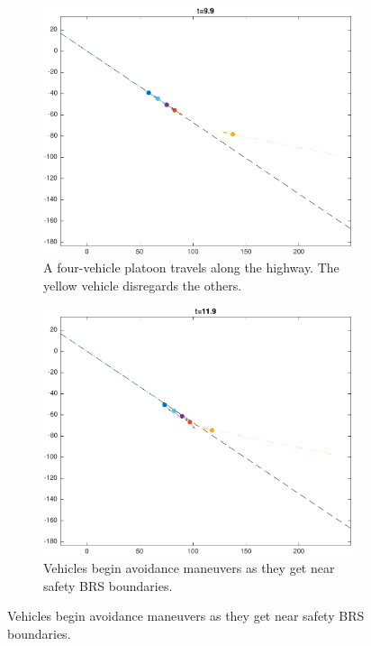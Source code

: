 \begin{figure}[h!]
    \centering
    \begin{subfigure}[t]{0.9\columnwidth} \label{subfig:in_100}
        \includegraphics[width=\columnwidth]{in_100}
        \caption{A four-vehicle platoon travels along the highway. The yellow vehicle disregards the others.}
    \end{subfigure}
    \begin{subfigure}[t]{0.9\columnwidth} \label{subfig:in_120}
        \includegraphics[width=\columnwidth]{in_120}
        \caption{Vehicles begin avoidance maneuvers as they get near safety BRS boundaries.}
    \end{subfigure}


\end{figure}
